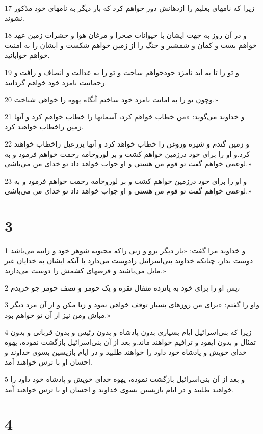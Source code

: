 \par 17 زیرا که نامهای بعلیم را ازدهانش دور خواهم کرد که بار دیگر به نامهای خود مذکور نشوند.
\par 18 و در آن روز به جهت ایشان با حیوانات صحرا و مرغان هوا و حشرات زمین عهد خواهم بست و کمان و شمشیر و جنگ را از زمین خواهم شکست و ایشان را به امنیت خواهم خوابانید.
\par 19 و تو را تا به ابد نامزد خودخواهم ساخت و تو را به عدالت و انصاف و رافت و رحمانیت نامزد خود خواهم گردانید.
\par 20 وچون تو را به امانت نامزد خود ساختم آنگاه یهوه را خواهی شناخت.»
\par 21 و خداوند می‌گوید: «من خطاب خواهم کرد، آسمانها را خطاب خواهم کرد و آنها زمین راخطاب خواهند کرد.
\par 22 و زمین گندم و شیره وروغن را خطاب خواهد کرد و آنها یزرعیل راخطاب خواهند کرد.و او را برای خود درزمین خواهم کشت و بر لوروحامه رحمت خواهم فرمود و به لوعمی خواهم گفت تو قوم من هستی و او جواب خواهد داد تو خدای من می‌باشی.»
\par 23 و او را برای خود درزمین خواهم کشت و بر لوروحامه رحمت خواهم فرمود و به لوعمی خواهم گفت تو قوم من هستی و او جواب خواهد داد تو خدای من می‌باشی.»

\chapter{3}

\par 1 و خداوند مرا گفت: «بار دیگر برو و زنی راکه محبوبه شوهر خود و زانیه می‌باشد دوست بدار، چنانکه خداوند بنی‌اسرائیل رادوست می‌دارد با آنکه ایشان به خدایان غیر مایل می‌باشند و قرصهای کشمش را دوست می‌دارند.»
\par 2 پس او را برای خود به پانزده مثقال نقره و یک حومر و نصف حومر جو خریدم،
\par 3 واو را گفتم: «برای من روزهای بسیار توقف خواهی نمود و زنا مکن و از آن مرد دیگر مباش ومن نیز از آن تو خواهم بود.»
\par 4 زیرا که بنی‌اسرائیل ایام بسیاری بدون پادشاه و بدون رئیس و بدون قربانی و بدون تمثال و بدون ایفود و ترافیم خواهند ماند.و بعد از آن بنی‌اسرائیل بازگشت نموده، یهوه خدای خویش و پادشاه خود داود را خواهند طلبید و در ایام بازپسین بسوی خداوند و احسان او با ترس خواهند آمد.
\par 5 و بعد از آن بنی‌اسرائیل بازگشت نموده، یهوه خدای خویش و پادشاه خود داود را خواهند طلبید و در ایام بازپسین بسوی خداوند و احسان او با ترس خواهند آمد.

\chapter{4}

